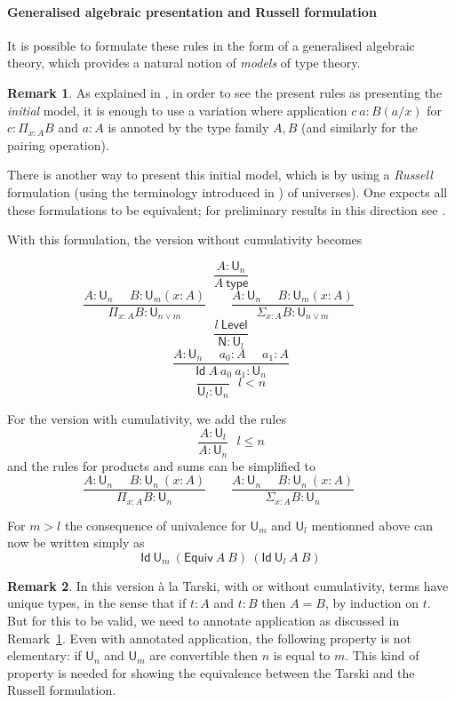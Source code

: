\documentclass[11pt,a4paper]{article}
\theoremstyle{definition}
\newtheorem{remark}{Remark}
\newcommand{\Id}{\mathsf{Id}}
\newcommand{\NN}{\mathsf{N}}
\newcommand{\UU}{\mathsf{U}}
\newcommand{\Level}{\mathsf{Level}}
\newcommand{\type}{\mathsf{type}}
\newcommand{\mypi}[3]{\Pi_{#1:#2}#3}
\newcommand{\mysig}[3]{\Sigma_{#1:#2}#3}
\newcommand{\Equiv}{\mathsf{Equiv}}
\begin{document}
\paragraph{Generalised algebraic presentation and Russell formulation}

It is possible to formulate these rules in the form of a generalised algebraic theory, which provides
a natural notion of {\em models} of type theory.

\begin{remark} \label{app:annotation}
As explained
in \cite{streicher:semtt}, in order to see the present rules as presenting the {\em initial} model,
it is enough to use a variation where application $c~a:B(a/x)$ for $c:\mypi{x}{A}B$ and $a:A$
is annoted by the type family $A,B$ (and similarly for the pairing operation).
\end{remark}

\medskip

There is another way to present this initial model, which is by using
a {\em Russell} formulation (using the terminology introduced in \cite{martinlof:padova}) of
universes). One expects all these formulations to be equivalent; for preliminary results in this
direction see \cite{Assaf14,Thire20}.

With this formulation, the version without cumulativity becomes

$$
\frac{A:\UU_{n}}{A~\type}
$$
$$
\frac{A:\UU_{n}~~~~~~B:\UU_m(x:A)}
     {\mypi{x}{A}{B}:\UU_{n\vee m}}~~~~~~~~~
\frac{A:\UU_{n}~~~~~~B:\UU_m(x:A)}
     {\mysig{x}{A}{B}:\UU_{n\vee m}}~~~~~~~~~
$$
$$\frac{l~\Level}{\NN:\UU_{l}}$$
$$
\frac{A:\UU_n~~~~~~a_0:A~~~~~~a_1:A}
{\Id~A~a_0~a_1:\UU_n}
$$
$$
\frac{}{{\UU_l}:\UU_{n}}{~~~l<n}
$$

\medskip

For the version with cumulativity, we add the rules
$$
\frac{A:\UU_{l}}{A:\UU_{n}}{~~~l\leqslant n}
$$
and the rules for products and sums can be simplified to
$$
\frac{A:\UU_{n}~~~~~~B:\UU_n~(x:A)}
     {\mypi{x}{A}{B}:\UU_{n}}~~~~~~~~~
\frac{A:\UU_{n}~~~~~~B:\UU_n~(x:A)}
     {\mysig{x}{A}{B}:\UU_{n}}~~~~~~~~~
$$

     For $m>l$ the consequence of univalence for $\UU_m$ and $\UU_l$ mentionned above can now be written
     simply as
     $$\Id~\UU_m~(\Equiv~A~B)~(\Id~\UU_l~A~B)$$



\begin{remark}
  In this version \`a la Tarski, with or without cumulativity, terms have unique types, in the sense that if $t : A$ and $t : B$ then $A = B$, by induction on $t$. But for this to be valid, we need to annotate application as discussed in Remark~\ref{app:annotation}.
  Even with annotated application, the following property is not elementary: if $\UU_n$ and $\UU_m$ are convertible then $n$ is equal to $m$. This kind of property is needed for showing the equivalence between the Tarski and the Russell formulation.
\end{remark}
\end{document}
